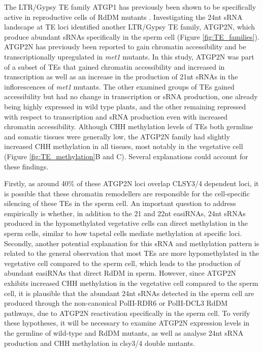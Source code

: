 The LTR/Gypsy TE family ATGP1 has previously been shown to be specifically active in reproductive cells of RdDM mutants \cite{RN187}. Investigating the 24nt sRNA landscape at TE loci identified another LTR/Gypsy TE family, ATGP2N, which produce abundant sRNAs specifically in the sperm cell (Figure \ref{fig:TE_families}). ATGP2N has previously been reported to gain chromatin accessibility and be transcriptionally upregulated in \textit{met1} mutants. In this study, ATGP2N was part of a subset of TEs that gained chromatin accessibility and increased in transcription as well as an increase in the production of 21nt sRNAs in the inflorescences of \textit{met1} mutants. The other examined groups of TEs gained accessibility but had no change in transcription or sRNA production, one already being highly expressed in wild type plants, and the other remaining repressed with respect to transcription and sRNA production even with increased chromatin accessibility\cite{RN184}. Although CHH methylation levels of TEs  both germline and somatic tissues were generally low, the ATGP2N family had slightly increased CHH methylation in all tissues, most notably in the vegetative cell (Figure \ref{fig:TE_methylation}B and C). Several explanations could account for these findings. 

Firstly, as around 40\% of these ATGP2N loci overlap CLSY3/4 dependent loci, it is possible that these chromatin remodellers are responsible for the cell-specific silencing of these TEs in the sperm cell. An important question to address empirically is whether, in addition to the 21 and 22nt easiRNAs, 24nt sRNAs produced in the hypomethylated vegetative cells can direct methylation in the sperm cells, similar to how tapetal cells mediate methylation at specific loci. Secondly, another potential explanation for this sRNA and methylation pattern is related to the general observation that most TEs are more hypomethylated in the vegetative cell compared to the sperm cell, which leads to the production of abundant easiRNAs that direct RdDM in sperm.  However, since ATGP2N exhibits increased CHH methylation in the vegetative cell compared to the sperm cell, it is plausible that the abundant 24nt sRNAs detected in the sperm cell are produced through the non-canonical PolII-RDR6 or PolII-DCL3 RdDM pathways, due to ATGP2N reactivation specifically in the sperm cell. To verify these hypotheses, it will be necessary to examine ATGP2N expression levels in the germline of wild-type and RdDM mutants, as well as analyse 24nt sRNA production and CHH methylation in clsy3/4 double mutants.


